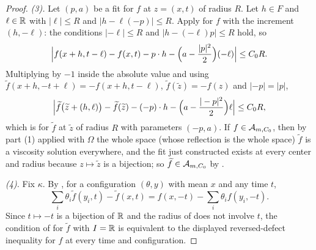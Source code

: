 \begin{proof}
\emph{(3).} Let $(p,a)$ be a fit for $f$ at $z=(x,t)$ of radius $R$. Let $h\in F$
and $\ell\in\mathbb{R}$ with $|\ell|\le R$ and $|h-\ell(-p)|\le R$. Apply
 for $f$ with the increment $(h,-\ell)$: the conditions
$|-\ell|\le R$ and $|h-(-\ell)p|\le R$ hold, so
\[
  \Bigl|f(x+h,t-\ell)-f(x,t)-p\cdot h-\Bigl(a-\frac{|p|^2}2\Bigr)(-\ell)\Bigr|
   \le C_0R .
\]
Multiplying by $-1$ inside the absolute value and using
$\widetilde f(x+h,-t+\ell)=-f(x+h,t-\ell)$, $\widetilde f(\widetilde z)=-f(z)$
and $|-p|=|p|$,
\[
  \Bigl|\widetilde f\bigl(\widetilde z+(h,\ell)\bigr)-\widetilde f(\widetilde z)
    -(-p)\cdot h-\Bigl(a-\frac{|-p|^2}2\Bigr)\ell\Bigr|\le C_0R,
\]
which is  for $\widetilde f$ at $\widetilde z$ of radius $R$ with
parameters $(-p,a)$. If $f\in\mathcal{A}_{m,C_0}$, then by part (1) applied with
$\Omega$ the whole space (whose reflection is the whole space) $\widetilde f$ is
a viscosity solution everywhere, and the fit just constructed exists at every
center and radius because $z\mapsto\widetilde z$ is a bijection; so
$\widetilde f\in\mathcal{A}_{m,C_0}$ by .

\emph{(4).} Fix $\kappa$. By , for a configuration
$(\theta,y)$ with mean $x$ and any time $t$,
\[
  \sum_i\theta_i\widetilde f(y_i,t)-\widetilde f(x,t)
   =f(x,-t)-\sum_i\theta_if(y_i,-t).
\]
Since $t\mapsto-t$ is a bijection of $\mathbb{R}$ and the radius of
 does not involve $t$, the condition of
 for $\widetilde f$ with $I=\mathbb{R}$ is equivalent to the
displayed reversed-defect inequality for $f$ at every time and configuration.
\end{proof}
